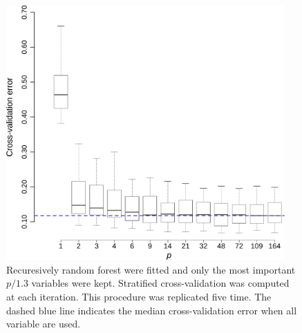 \begin{figure}[h!]
  \centering    
    \includegraphics[width=0.95\textwidth]{figures/variable_elimination.pdf}
  \caption{
  Recuresively random forest were fitted and only the most important $p/1.3$ variables were kept.
  Stratified cross-validation was computed at each iteration. This procedure was replicated five time.
  The dashed blue line indicates the median cross-validation error when all variable are used.
  \label{fig:variable_elimination}
  }
\end{figure}
